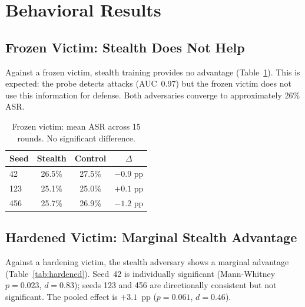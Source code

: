 \documentclass[11pt]{article}
\begin{document}
\section{Behavioral Results}
\label{sec:behavioral}

\subsection{Frozen Victim: Stealth Does Not Help}

Against a frozen victim, stealth training provides no advantage (Table~\ref{tab:frozen}).
This is expected: the probe detects attacks (AUC~0.97) but the frozen victim does not use this information for defense.
Both adversaries converge to approximately 26\% ASR.

\begin{table}[h]
\centering
\begin{tabular}{lccc}
\toprule
\textbf{Seed} & \textbf{Stealth} & \textbf{Control} & \textbf{$\Delta$} \\
\midrule
42  & 26.5\% & 27.5\% & $-0.9$ pp \\
123 & 25.1\% & 25.0\% & $+0.1$ pp \\
456 & 25.7\% & 26.9\% & $-1.2$ pp \\
\bottomrule
\end{tabular}
\caption{Frozen victim: mean ASR across 15 rounds. No significant difference.}
\label{tab:frozen}
\end{table}

\subsection{Hardened Victim: Marginal Stealth Advantage}

Against a hardening victim, the stealth adversary shows a marginal advantage (Table~\ref{tab:hardened}).
Seed~42 is individually significant (Mann-Whitney $p=0.023$, $d=0.83$); seeds 123 and 456 are directionally consistent but not significant.
The pooled effect is $+3.1$~pp ($p=0.061$, $d=0.46$).
\end{document}
